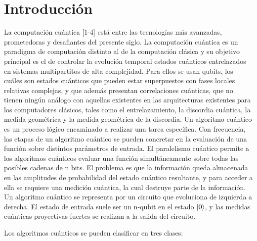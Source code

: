 \chapter{Introducci\'on}

La computación cuántica [1-4] está entre las tecnologías más avanzadas, prometedoras y desafiantes del presente siglo. La computación cuántica es un paradigma de computación distinto al de la computación clásica y su objetivo principal es el de controlar la evolución temporal estados cuánticos entrelazados en sistemas multipartitos de alta complejidad. Para ellos se usan qubits, los cuáles son estados cuánticos que pueden estar superpuestos con fases locales relativas complejas, y que además presentan correlaciones cuánticas, que no tienen ningún análogo con aquellas existentes en las arquitecturas existentes para los computadores clásicos, tales como el entrelazamiento, la discordia cuántica, la medida geométrica y la medida geométrica de la discordia.  Un algoritmo cuántico es un proceso lógico encaminado a realizar una tarea específica. Con frecuencia, las etapas de un algoritmo cuántico se pueden concretar en la evaluación de una función sobre distintos parámetros de entrada. El paralelismo cuántico permite a los algoritmos cuánticos evaluar una función simultáneamente sobre todas las posibles cadenas de n bits. El problema es que la información queda almacenada en las amplitudes de probabilidad del estado cuántico resultante, y para acceder a ella se requiere una medición cuántica, la cual destruye parte de la información. Un algoritmo cuántico se representa por un circuito que evoluciona de izquierda a derecha. El estado de entrada suele ser un n-qubit en el estado $\ket{0}$, y las medidas cuánticas proyectivas fuertes se realizan a la salida del circuito.

Los algoritmos cuánticos se pueden clasificar en tres clases:

